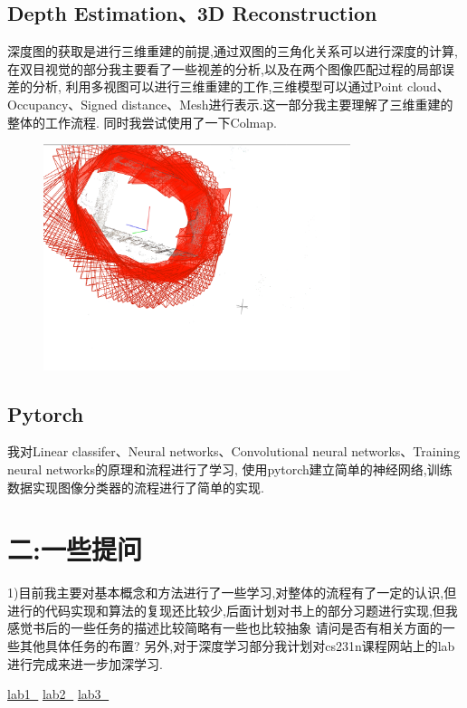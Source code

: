 \documentclass{article}
\begin{document}
\subsection*{Depth Estimation、3D Reconstruction}
深度图的获取是进行三维重建的前提,通过双图的三角化关系可以进行深度的计算,在双目视觉的部分我主要看了一些视差的分析,以及在两个图像匹配过程的局部误差的分析,
利用多视图可以进行三维重建的工作,三维模型可以通过Point cloud、Occupancy、Signed distance、Mesh进行表示.这一部分我主要理解了三维重建的整体的工作流程.
同时我尝试使用了一下Colmap.
\begin{figure}[H]
    \centering
    \includegraphics[width=0.8\textwidth]{1.png}
    \end{figure}


\subsection*{Pytorch}
我对Linear classifer、Neural networks、Convolutional neural networks、Training neural networks的原理和流程进行了学习,
使用pytorch建立简单的神经网络,训练数据实现图像分类器的流程进行了简单的实现.


\section*{二:一些提问}

1)目前我主要对基本概念和方法进行了一些学习,对整体的流程有了一定的认识,但进行的代码实现和算法的复现还比较少,后面计划对书上的部分习题进行实现,但我感觉书后的一些任务的描述比较简略有一些也比较抽象
请问是否有相关方面的一些其他具体任务的布置? 另外,对于深度学习部分我计划对cs231n课程网站上的lab进行完成来进一步加深学习.

\href{https://cs231n.github.io/assignments2022/assignment1/}{lab1 🔗}
\href{https://cs231n.github.io/assignments2022/assignment2/}{lab2 🔗}
\href{https://cs231n.github.io/assignments2022/assignment3/}{lab3 🔗}
\end{document}
